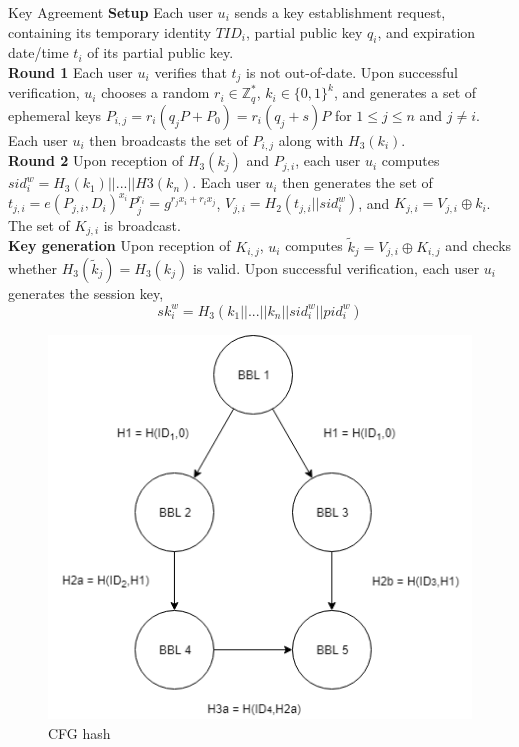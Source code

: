 \documentclass[final]{beamer}
\newlength{\onecolwid}
\newlength{\twocolwid}
\begin{document}
\begin{frame}[t]
\begin{columns}[t]
\begin{column}{\twocolwid}
\begin{columns}[t,totalwidth=\twocolwid]
\begin{column}{\onecolwid}
\begin{block}{Key Agreement}
\textbf{Setup} Each user $u_i$ sends a key establishment request, containing its temporary identity $TID_i$, partial public key $q_i$, and expiration date/time $t_i$ of its partial public key. \\
\textbf{Round 1} Each user $u_i$ verifies that $t_j$ is not out-of-date. Upon successful verification, $u_i$ chooses a random $r_i \in \mathbb{Z}_q^*$, $k_i \in \{0,1\}^k$, and generates a set of ephemeral keys $P_{i,j}=r_i(q_jP+P_0)=r_i(q_j+s)P$ for $1\leq j\leq n$ and $j\neq i$. Each user $u_i$ then broadcasts the set of $P_{i,j}$ along with $H_3(k_i)$. \\
\textbf{Round 2} Upon reception of $H_3(k_j)$ and $P_{j,i}$, each user $u_i$ computes $sid_i^w=H_3(k_1)||...||H3(k_n)$. Each user $u_i$ then generates the set of $t_{j,i}=e(P_{j,i},D_i)^{x_i}P_j^{r_i}=g^{r_jx_i+r_ix_j}$, $V_{j,i}=H_2(t_{j,i}||sid_i^w)$, and $K_{j,i}=V_{j,i}\oplus k_i$. The set of $K_{j,i}$ is broadcast. \\
\textbf{Key generation} Upon reception of $K_{i,j}$, $u_i$ computes $\tilde{k}_j=V_{j,i}\oplus K_{i,j}$ and checks whether $H_3(\tilde{k}_j)=H_3(k_j)$ is valid. Upon successful verification, each user $u_i$ generates the session key, \[sk_i^w=H_3(k_1||...||k_n||sid_i^w||pid_i^w)\]

\end{block}

\begin{figure}
\includegraphics[width=\linewidth]{images/CFGhash.png}
\caption{CFG hash}
\vspace{-1cm}
\end{figure}


\end{column}
\end{columns}
\end{column}
\end{columns}
\end{frame}
\end{document}
